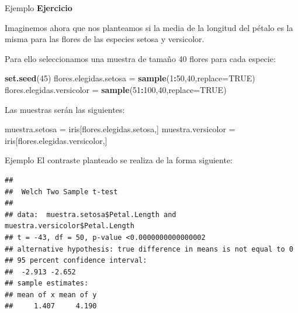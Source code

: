 \documentclass[
  ignorenonframetext,
]{beamer}
\newenvironment{Shaded}{\begin{snugshade}}{\end{snugshade}}
\newcommand{\DataTypeTok}[1]{\textcolor[rgb]{0.13,0.29,0.53}{#1}}
\newcommand{\DecValTok}[1]{\textcolor[rgb]{0.00,0.00,0.81}{#1}}
\newcommand{\KeywordTok}[1]{\textcolor[rgb]{0.13,0.29,0.53}{\textbf{#1}}}
\newcommand{\NormalTok}[1]{#1}
\newcommand{\OperatorTok}[1]{\textcolor[rgb]{0.81,0.36,0.00}{\textbf{#1}}}
\newcommand{\OtherTok}[1]{\textcolor[rgb]{0.56,0.35,0.01}{#1}}
\newcommand{\StringTok}[1]{\textcolor[rgb]{0.31,0.60,0.02}{#1}}
\begin{document}
\begin{frame}[fragile]{Ejemplo}
\protect\hypertarget{ejemplo-30}{}
\textbf{Ejercicio}

Imaginemos ahora que nos planteamos si la media de la longitud del
pétalo es la misma para las flores de las especies setosa y versicolor.

Para ello seleccionamos una muestra de tamaño 40 flores para cada
especie:

\begin{Shaded}
\begin{Highlighting}[]
\KeywordTok{set.seed}\NormalTok{(}\DecValTok{45}\NormalTok{)}
\NormalTok{flores.elegidas.setosa =}\StringTok{ }\KeywordTok{sample}\NormalTok{(}\DecValTok{1}\OperatorTok{:}\DecValTok{50}\NormalTok{,}\DecValTok{40}\NormalTok{,}\DataTypeTok{replace=}\OtherTok{TRUE}\NormalTok{)}
\NormalTok{flores.elegidas.versicolor =}\StringTok{ }\KeywordTok{sample}\NormalTok{(}\DecValTok{51}\OperatorTok{:}\DecValTok{100}\NormalTok{,}\DecValTok{40}\NormalTok{,}\DataTypeTok{replace=}\OtherTok{TRUE}\NormalTok{)}
\end{Highlighting}
\end{Shaded}

Las muestras serán las siguientes:

\begin{Shaded}
\begin{Highlighting}[]
\NormalTok{muestra.setosa =}\StringTok{ }\NormalTok{iris[flores.elegidas.setosa,]}
\NormalTok{muestra.versicolor =}\StringTok{ }\NormalTok{iris[flores.elegidas.versicolor,]}
\end{Highlighting}
\end{Shaded}
\end{frame}

\begin{frame}[fragile]{Ejemplo}
\protect\hypertarget{ejemplo-31}{}
El contraste planteado se realiza de la forma siguiente:

\begin{Shaded}
\end{Shaded}

\begin{verbatim}
## 
##  Welch Two Sample t-test
## 
## data:  muestra.setosa$Petal.Length and muestra.versicolor$Petal.Length
## t = -43, df = 50, p-value <0.0000000000000002
## alternative hypothesis: true difference in means is not equal to 0
## 95 percent confidence interval:
##  -2.913 -2.652
## sample estimates:
## mean of x mean of y 
##     1.407     4.190
\end{verbatim}
\end{frame}
\end{document}
